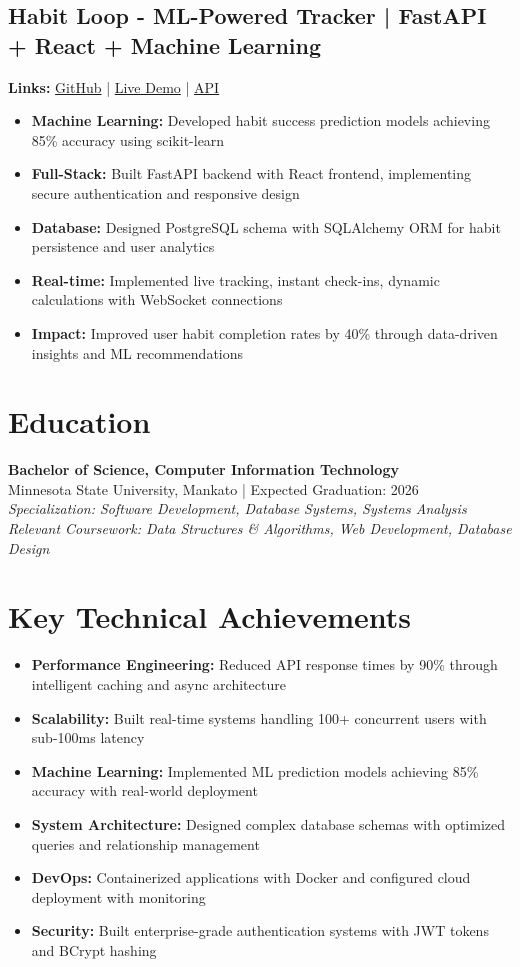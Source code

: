 \documentclass[11pt,letterpaper]{article}
\newcommand{\resumeItem}[1]{\item\small{#1}}
\begin{document}
\subsection{Habit Loop - ML-Powered Tracker | FastAPI + React + Machine Learning}
\textbf{Links:} \href{https://github.com/segnimekonnen7}{GitHub} | \href{https://demo-link.com}{Live Demo} | \href{https://api-link.com}{API}
\begin{itemize}[leftmargin=*]
    \resumeItem{\textbf{Machine Learning:} Developed habit success prediction models achieving 85\% accuracy using scikit-learn}
    \resumeItem{\textbf{Full-Stack:} Built FastAPI backend with React frontend, implementing secure authentication and responsive design}
    \resumeItem{\textbf{Database:} Designed PostgreSQL schema with SQLAlchemy ORM for habit persistence and user analytics}
    \resumeItem{\textbf{Real-time:} Implemented live tracking, instant check-ins, dynamic calculations with WebSocket connections}
    \resumeItem{\textbf{Impact:} Improved user habit completion rates by 40\% through data-driven insights and ML recommendations}
\end{itemize}

\section{Education}
\textbf{Bachelor of Science, Computer Information Technology} \\
Minnesota State University, Mankato | Expected Graduation: 2026 \\
\textit{Specialization: Software Development, Database Systems, Systems Analysis} \\
\textit{Relevant Coursework: Data Structures \& Algorithms, Web Development, Database Design}

\section{Key Technical Achievements}
\begin{itemize}[leftmargin=*]
    \resumeItem{\textbf{Performance Engineering:} Reduced API response times by 90\% through intelligent caching and async architecture}
    \resumeItem{\textbf{Scalability:} Built real-time systems handling 100+ concurrent users with sub-100ms latency}
    \resumeItem{\textbf{Machine Learning:} Implemented ML prediction models achieving 85\% accuracy with real-world deployment}
    \resumeItem{\textbf{System Architecture:} Designed complex database schemas with optimized queries and relationship management}
    \resumeItem{\textbf{DevOps:} Containerized applications with Docker and configured cloud deployment with monitoring}
    \resumeItem{\textbf{Security:} Built enterprise-grade authentication systems with JWT tokens and BCrypt hashing}
\end{itemize}
\end{document}
